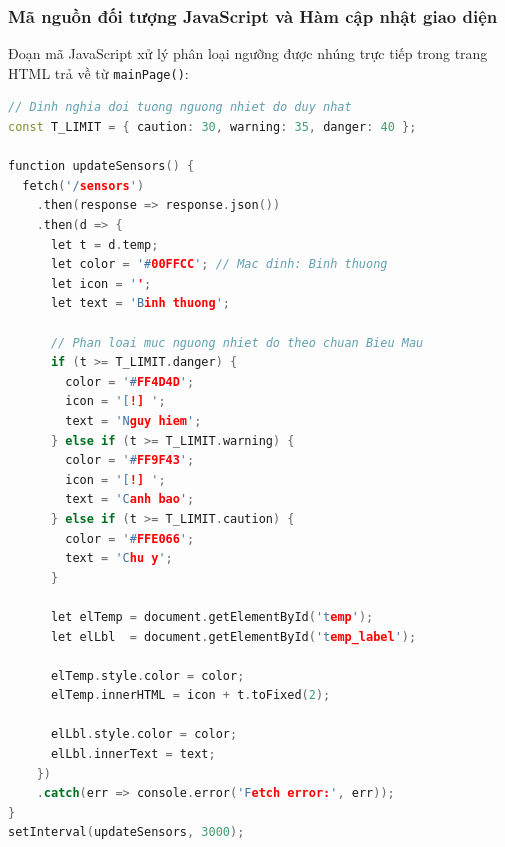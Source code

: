 \subsubsection{Mã nguồn đối tượng JavaScript và Hàm cập nhật giao diện}
Đoạn mã JavaScript xử lý phân loại ngưỡng được nhúng trực tiếp trong trang HTML trả về từ \texttt{mainPage()}:

\begin{lstlisting}[language=C++]
// Dinh nghia doi tuong nguong nhiet do duy nhat
const T_LIMIT = { caution: 30, warning: 35, danger: 40 };

function updateSensors() {
  fetch('/sensors')
    .then(response => response.json())
    .then(d => {
      let t = d.temp;
      let color = '#00FFCC'; // Mac dinh: Binh thuong
      let icon = '';
      let text = 'Binh thuong';

      // Phan loai muc nguong nhiet do theo chuan Bieu Mau
      if (t >= T_LIMIT.danger) {
        color = '#FF4D4D';
        icon = '[!] ';
        text = 'Nguy hiem';
      } else if (t >= T_LIMIT.warning) {
        color = '#FF9F43';
        icon = '[!] ';
        text = 'Canh bao';
      } else if (t >= T_LIMIT.caution) {
        color = '#FFE066';
        text = 'Chu y';
      }

      let elTemp = document.getElementById('temp');
      let elLbl  = document.getElementById('temp_label');

      elTemp.style.color = color;
      elTemp.innerHTML = icon + t.toFixed(2);

      elLbl.style.color = color;
      elLbl.innerText = text;
    })
    .catch(err => console.error('Fetch error:', err));
}
setInterval(updateSensors, 3000);
\end{lstlisting}


